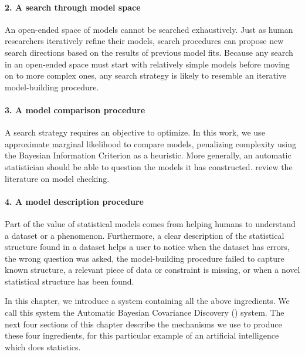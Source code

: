 \paragraph{2. A search through model space}
An open-ended space of models cannot be searched exhaustively.
Just as human researchers iteratively refine their models, search procedures can propose new search directions based on the results of previous model fits.
Because any search in an open-ended space must start with relatively simple models before moving on to more complex ones, any search strategy is likely to resemble an iterative model-building procedure.

\paragraph{3. A model comparison procedure}
A search strategy requires an objective to optimize.
In this work, we use approximate marginal likelihood to compare models, penalizing complexity using the Bayesian Information Criterion as a heuristic.
More generally, an automatic statistician should be able to question the models it has constructed.
\citet{gelman2012philosophy} review the literature on model checking.


\paragraph{4. A model description procedure}
Part of the value of statistical models comes from helping humans to understand a dataset or a phenomenon.
Furthermore, a clear description of the statistical structure found in a dataset helps a user to notice when the dataset has errors, the wrong question was asked, the model-building procedure failed to capture known structure, a relevant piece of data or constraint is missing, or when a novel statistical structure has been found.





In this chapter, we introduce a system containing all the above ingredients.
We call this system the Automatic Bayesian Covariance Discovery (\procedurename{}) system.
The next four sections of this chapter describe the mechanisms we use to produce these four ingredients, for this particular example of an artificial intelligence which does statistics.



